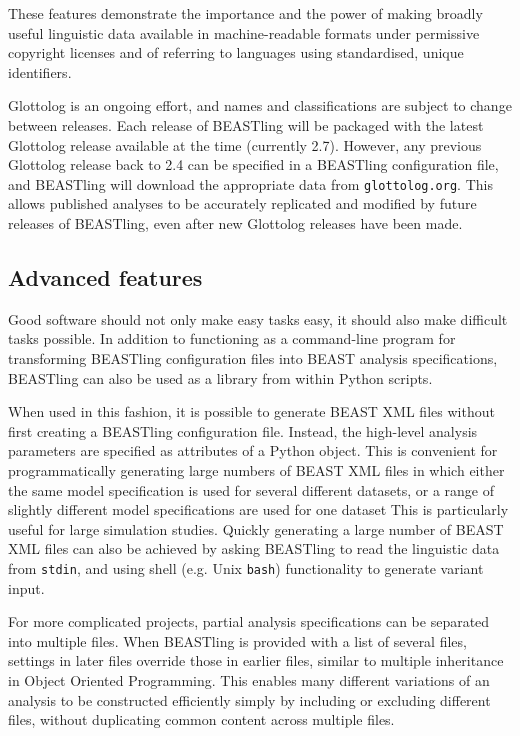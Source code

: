 \documentclass[10pt,a4paper]{article}
\begin{document}
These features demonstrate the importance and the power of making broadly useful linguistic data available in machine-readable formats under permissive copyright licenses and of referring to languages using standardised, unique identifiers.

Glottolog is an ongoing effort, and names and classifications are subject to change between releases.  Each release of BEASTling will be packaged with the latest Glottolog release available at the time (currently 2.7).  However, any previous Glottolog release back to 2.4 can be specified in a BEASTling configuration file, and BEASTling will download the appropriate data from \texttt{glottolog.org}.  This allows published analyses to be accurately replicated and modified by future releases of BEASTling, even after new Glottolog releases have been made.

\subsection{Advanced features}

Good software should not only make easy tasks easy, it should also make difficult tasks possible.  In addition to functioning as a command-line program for transforming BEASTling configuration files into BEAST analysis specifications, BEASTling can also be used as a library from within Python scripts.

When used in this fashion, it is possible to generate BEAST XML files without first creating a BEASTling configuration file.  Instead, the high-level analysis parameters are specified as attributes of a Python object.  This is convenient for programmatically generating large numbers of BEAST XML files in which either the same model specification is used for several different datasets, or a range of slightly different model specifications are used for one dataset  This is particularly useful for large simulation studies. Quickly generating a large number of BEAST XML files can also be achieved by asking BEASTling to read the linguistic data from \texttt{stdin}, and using shell (e.g. Unix \texttt{bash}) functionality to generate variant input.

For more complicated projects, partial analysis specifications can be separated into multiple files.  When BEASTling is provided with a list of several files, settings in later files override those in earlier files, similar to multiple inheritance in Object Oriented Programming.  This enables many different variations of an analysis to be constructed efficiently simply by including or excluding different files, without duplicating common content across multiple files.
\end{document}
